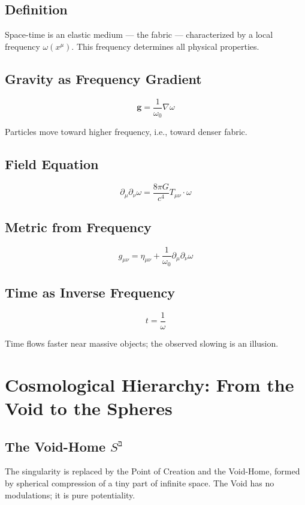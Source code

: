 \documentclass[12pt,a4paper]{article}
\begin{document}
\subsection{Definition}

Space-time is an elastic medium — the fabric — characterized by a local frequency \(\omega(x^\mu)\). This frequency determines all physical properties.

\subsection{Gravity as Frequency Gradient}

\[
\boxed{\mathbf{g} = \frac{1}{\omega_0} \nabla \omega}
\]

Particles move toward higher frequency, i.e., toward denser fabric.

\subsection{Field Equation}

\[
\boxed{\partial_\mu \partial_\nu \omega = \frac{8\pi G}{c^4} T_{\mu\nu} \cdot \omega}
\]

\subsection{Metric from Frequency}

\[
\boxed{g_{\mu\nu} = \eta_{\mu\nu} + \frac{1}{\omega_0} \partial_\mu \partial_\nu \omega}
\]

\subsection{Time as Inverse Frequency}

\[
\boxed{t = \frac{1}{\omega}}
\]

Time flows faster near massive objects; the observed slowing is an illusion.

\section{Cosmological Hierarchy: From the Void to the Spheres}

\subsection{The Void-Home \( S^{\text{בּ}} \)}

The singularity is replaced by the Point of Creation and the Void-Home, formed by spherical compression of a tiny part of infinite space. The Void has no modulations; it is pure potentiality.
\end{document}
